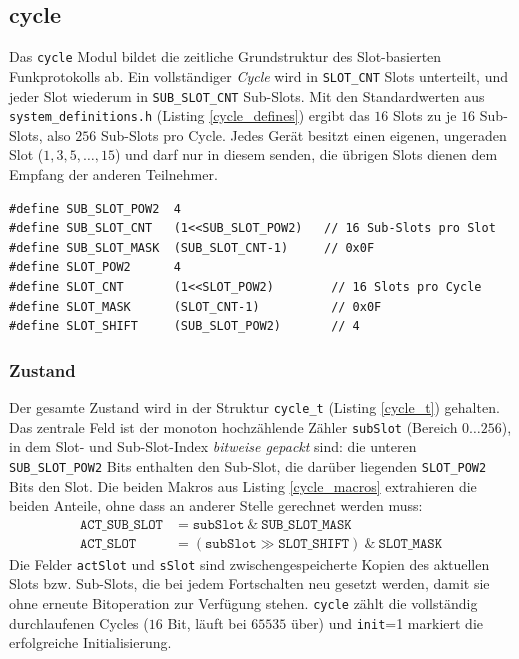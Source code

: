 \subsection{cycle}\label{cycle}
Das \verb|cycle| Modul bildet die zeitliche Grundstruktur des Slot-basierten
Funkprotokolls ab. Ein vollständiger \emph{Cycle} wird in \verb|SLOT_CNT|
Slots unterteilt, und jeder Slot wiederum in \verb|SUB_SLOT_CNT| Sub-Slots.
Mit den Standardwerten aus \verb|system_definitions.h| (Listing
\ref{cycle_defines}) ergibt das $16$ Slots zu je $16$ Sub-Slots, also $256$
Sub-Slots pro Cycle. Jedes Gerät besitzt einen eigenen, ungeraden Slot
($1, 3, 5, \dots, 15$) und darf nur in diesem senden, die übrigen
Slots dienen dem Empfang der anderen Teilnehmer.

\begin{listing}
\begin{verbatim}
#define SUB_SLOT_POW2  4
#define SUB_SLOT_CNT   (1<<SUB_SLOT_POW2)   // 16 Sub-Slots pro Slot
#define SUB_SLOT_MASK  (SUB_SLOT_CNT-1)     // 0x0F
#define SLOT_POW2      4
#define SLOT_CNT       (1<<SLOT_POW2)        // 16 Slots pro Cycle
#define SLOT_MASK      (SLOT_CNT-1)          // 0x0F
#define SLOT_SHIFT     (SUB_SLOT_POW2)       // 4
\end{verbatim}
\caption{Slot-Konstanten aus \texttt{system\_definitions.h}}
\label{cycle_defines}
\end{listing}

\subsubsection*{Zustand}
Der gesamte Zustand wird in der Struktur \verb|cycle_t| (Listing
\ref{cycle_t}) gehalten. Das zentrale Feld ist der monoton hochzählende
Zähler \verb|subSlot| (Bereich $0 \dots 256$), in dem Slot- und
Sub-Slot-Index \emph{bitweise gepackt} sind: die unteren
\verb|SUB_SLOT_POW2| Bits enthalten den Sub-Slot, die darüber liegenden
\verb|SLOT_POW2| Bits den Slot. Die beiden Makros aus Listing
\ref{cycle_macros} extrahieren die beiden Anteile, ohne dass an anderer
Stelle gerechnet werden muss:
\begin{align*}
\mathtt{ACT\_SUB\_SLOT} &= \mathtt{subSlot}\ \&\ \mathtt{SUB\_SLOT\_MASK} \\
\mathtt{ACT\_SLOT}      &= (\mathtt{subSlot} \gg \mathtt{SLOT\_SHIFT})\ \&\ \mathtt{SLOT\_MASK}
\end{align*}
Die Felder \verb|actSlot| und \verb|sSlot| sind zwischengespeicherte Kopien
des aktuellen Slots bzw. Sub-Slots, die bei jedem Fortschalten neu gesetzt
werden, damit sie ohne erneute Bitoperation zur Verfügung stehen.
\verb|cycle| zählt die vollständig durchlaufenen Cycles ($16$ Bit, läuft
bei $65535$ über) und \verb|init|=1 markiert die erfolgreiche Initialisierung.

